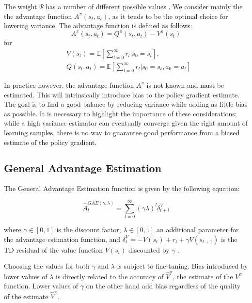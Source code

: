 The weight $\Psi$ has a number of different possible values \cite{schulman2015highdimensional}. We consider mainly the the advantage function $A^\pi(s_t, a_t)$, as it tends to be the optimal choice for lowering variance. The advantage function is defined as follows:
\begin{equation}
A^\pi(s_t,a_t) = Q^\pi(s_t, a_t) - V^\pi(s_t)
\end{equation}
for 
\begin{align*}
&V(s_t) = \mathbb{E}\left[\sum_{l=0}^{\infty} r_l | s_0 = s_t \right],\\
&Q(s_t, a_t) = \mathbb{E}\left[\sum_{l=0}^{\infty} r_l | s_0 = s_t, a_0 = a_t \right]
\end{align*}


In practice however, the advantage function $A^\pi$ is not known and must be estimated. This will intrinsically introduce bias to the policy gradient estimate. The goal is to find a good balance by reducing variance while adding as little bias as possible. It is necessary to highlight the importance of these considerations; while a high variance estimator can eventually converge given the right amount of learning samples, there is no way to guarantee good performance from a biased estimate of the policy gradient. 

\subsection{General Advantage Estimation}

The General Advantage Estimation\cite{schulman2015highdimensional} function is given by the following equation:

\begin{equation}
\hat{A}_t^{GAE(\gamma, \lambda)} = \sum_{l=0}^{\infty}(\gamma \lambda)^l \delta^V_{t+l}
\end{equation}

where $\gamma \in [0,1]$ is the discount factor, $\lambda \in [0,1]$ an additional parameter for the advantage estimation function, and $\delta^V_t = -V(s_t) + r_t + \gamma V(s_{t+1})$ is the TD residual of the value function $V(s_t)$ discounted by $\gamma$ \cite{sutton1998introduction}.

Choosing the values for both $\gamma$ and $\lambda$ is subject to fine-tuning. Bias introduced by lower values of $\lambda$ is directly related to the accuracy of $\hat{V}^\pi$, the estimate of the $V^\pi$ function. Lower values of $\gamma$ on the other hand add bias regardless of the quality of the estimate $\hat{V}^\pi$.

